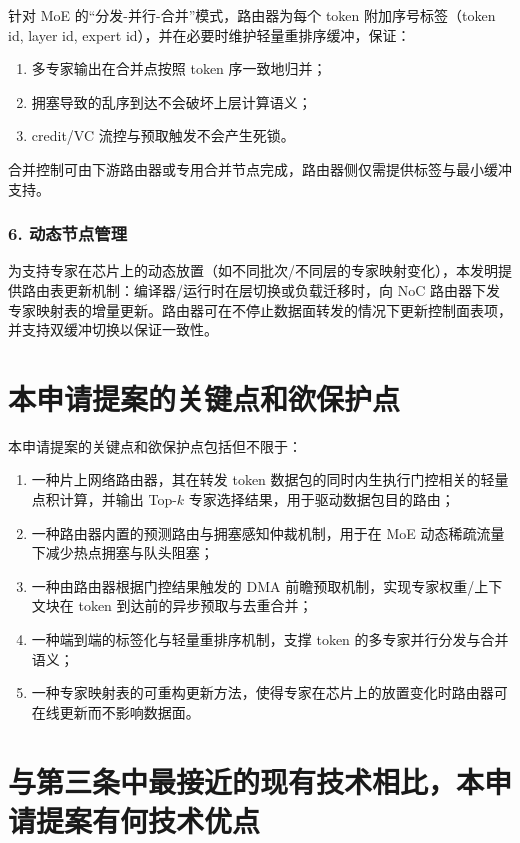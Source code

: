 \documentclass[12pt,a4paper]{article}
\begin{document}
针对 MoE 的“分发-并行-合并”模式，路由器为每个 token 附加序号标签（token id, layer id, expert id），并在必要时维护轻量重排序缓冲，保证：
\begin{enumerate}
    \item 多专家输出在合并点按照 token 序一致地归并；
    \item 拥塞导致的乱序到达不会破坏上层计算语义；
    \item credit/VC 流控与预取触发不会产生死锁。
\end{enumerate}
合并控制可由下游路由器或专用合并节点完成，路由器侧仅需提供标签与最小缓冲支持。

\subsubsection{6. 动态节点管理}

为支持专家在芯片上的动态放置（如不同批次/不同层的专家映射变化），本发明提供路由表更新机制：编译器/运行时在层切换或负载迁移时，向 NoC 路由器下发专家映射表的增量更新。路由器可在不停止数据面转发的情况下更新控制面表项，并支持双缓冲切换以保证一致性。

\section{本申请提案的关键点和欲保护点}

本申请提案的关键点和欲保护点包括但不限于：
\begin{enumerate}
    \item 一种片上网络路由器，其在转发 token 数据包的同时内生执行门控相关的轻量点积计算，并输出 Top-$k$ 专家选择结果，用于驱动数据包目的路由；
    \item 一种路由器内置的预测路由与拥塞感知仲裁机制，用于在 MoE 动态稀疏流量下减少热点拥塞与队头阻塞；
    \item 一种由路由器根据门控结果触发的 DMA 前瞻预取机制，实现专家权重/上下文块在 token 到达前的异步预取与去重合并；
    \item 一种端到端的标签化与轻量重排序机制，支撑 token 的多专家并行分发与合并语义；
    \item 一种专家映射表的可重构更新方法，使得专家在芯片上的放置变化时路由器可在线更新而不影响数据面。
\end{enumerate}

\section{与第三条中最接近的现有技术相比，本申请提案有何技术优点}
\end{document}
